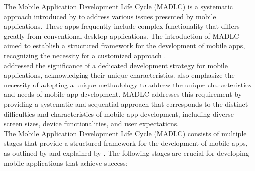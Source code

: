 The Mobile Application Development Life Cycle (MADLC) is a systematic approach introduced by \textcite{vithani14} to address various issues presented by mobile applications. These apps frequently include complex functionality that differs greatly from conventional desktop applications. The introduction of MADLC aimed to establish a structured framework for the development of mobile apps, recognizing the necessity for a customized approach \parencite{vithani14}. \\

\textcite{kaur15} addressed the significance of a dedicated development strategy for mobile applications, acknowledging their unique characteristics. \textcite{kaur15} also emphasize the necessity of adopting a unique methodology to address the unique characteristics and needs of mobile app development. MADLC addresses this requirement by providing a systematic and sequential approach that corresponds to the distinct difficulties and characteristics of mobile app development, including diverse screen sizes, device functionalities, and user expectations. \\

The Mobile Application Development Life Cycle (MADLC) consists of multiple stages that provide a structured framework for the development of mobile apps, as outlined by \textcite{wambua23} and explained by \textcite{wen21}. The following stages are crucial for developing mobile applications that achieve success:

